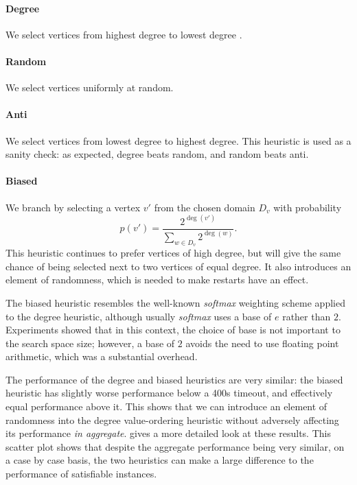 \documentclass{article}
\newcommand{\citep}[1]{\cite{#1}}
\begin{document}
\paragraph{Degree} We select vertices from highest degree to lowest degree
\citep{DBLP:conf/ijcai/McCreeshPT16}.

\paragraph{Random} We select vertices uniformly at random.

\paragraph{Anti} We select vertices from lowest degree to highest degree. This heuristic is used as
a sanity check: as expected, degree beats random, and random beats anti.

\paragraph{Biased} We branch by selecting a vertex $v'$ from the chosen domain $D_v$ with
probability \[ p(v') = \frac{2^{\deg(v')}}{\sum_{w \in D_v}{2^{\deg(w)}}} \text{.} \] This heuristic
continues to prefer vertices of high degree, but will give the same chance of being selected next to
two vertices of equal degree.  It also introduces an element of randomness, which is needed to make
restarts have an effect.

The biased heuristic resembles the well-known \emph{softmax} weighting scheme applied to the degree
heuristic, although usually \emph{softmax} uses a base of $e$ rather than $2$.  Experiments showed
that in this context, the choice of base is not important to the search space size; however, a base
of $2$ avoids the need to use floating point arithmetic, which was a substantial overhead.

The performance of the degree and biased heuristics are very similar: the
biased heuristic has slightly worse performance below a 400s timeout, and effectively equal
performance above it. This shows that we can introduce an element of randomness into the degree
value-ordering heuristic without adversely affecting its performance \emph{in aggregate}.
 gives a more detailed look at these results. This scatter plot
shows that despite the aggregate performance being very similar, on a case by case basis, the two
heuristics can make a large difference to the performance of satisfiable instances.
\end{document}
